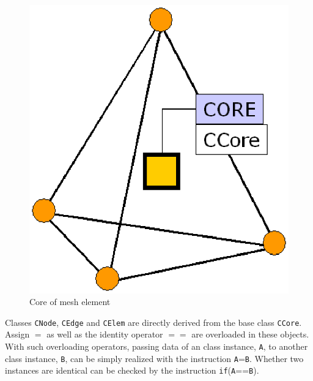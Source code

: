 \begin{figure}[H]
\centering
\includegraphics[scale=0.4]{figures/core.eps}
\caption{Core of mesh element} \label{fig:coree}
\end{figure}


Classes \texttt{CNode}, \texttt{CEdge} and \texttt{CElem} are
directly derived from the base class \texttt{CCore}. Assign $=$ as
well as the identity operator $==$ are overloaded in these
objects. With such overloading operators, passing data of an class
instance, \texttt{A}, to another class instance, \texttt{B}, can
be simply realized with the instruction
\mbox{\texttt{A}=\texttt{B}}. Whether two instances are identical
can be checked by the instruction
\mbox{\texttt{if}(\texttt{A}==\texttt{B})}.

